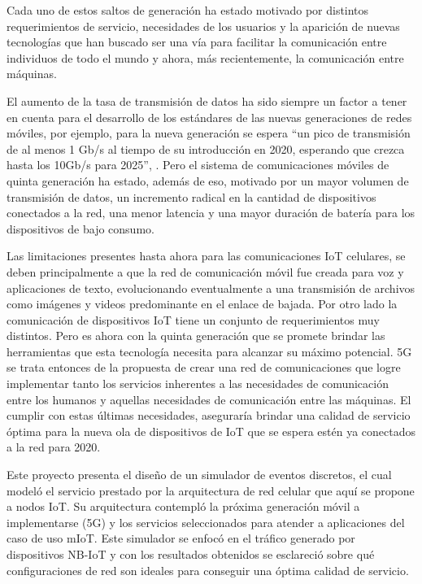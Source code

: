 Cada uno de estos saltos de generación ha estado motivado por distintos requerimientos de servicio, necesidades de los usuarios y la aparición de nuevas tecnologías que han buscado ser una vía para facilitar la comunicación entre individuos de todo el mundo y ahora, más recientemente, la comunicación entre máquinas.\newline

El aumento de la tasa de transmisión de datos ha sido siempre un factor a tener en cuenta para el desarrollo de los estándares de las nuevas generaciones de redes móviles, por ejemplo, para la nueva generación se espera “un pico de transmisión de al menos 1 Gb/s al tiempo de su introducción en 2020, esperando que crezca hasta los 10Gb/s para 2025”, \parencite{Fettweis2016}. Pero el sistema de comunicaciones móviles de quinta generación ha estado, además de eso, motivado por un mayor volumen de transmisión de datos, un incremento radical en la cantidad de dispositivos conectados a la red, una menor latencia y una mayor duración de batería para los dispositivos de bajo consumo.\newline

Las limitaciones presentes hasta ahora para las comunicaciones IoT celulares, se deben principalmente a que la red de comunicación móvil fue creada para voz y aplicaciones de texto, evolucionando eventualmente a una transmisión de archivos como imágenes y videos predominante en el enlace de bajada. Por otro lado la comunicación de dispositivos IoT tiene un conjunto de requerimientos muy distintos. Pero es ahora con la quinta generación que se promete brindar las herramientas que esta tecnología necesita para alcanzar su máximo potencial. 5G se trata entonces de la propuesta de crear una red de comunicaciones que logre implementar tanto los servicios inherentes a las necesidades de comunicación entre los humanos y aquellas necesidades de comunicación entre las máquinas. El cumplir con estas últimas necesidades, aseguraría brindar una calidad de servicio óptima para la nueva ola de dispositivos de IoT que se espera estén ya conectados a la red para 2020.\newline

Este proyecto presenta el diseño de un simulador de eventos discretos, el cual modeló el servicio prestado por la arquitectura de red celular que aquí se propone a nodos IoT. Su arquitectura contempló la próxima generación móvil a implementarse (5G) y los servicios seleccionados para atender a aplicaciones del caso de uso mIoT. Este simulador se enfocó en el tráfico generado por dispositivos NB-IoT y con los resultados obtenidos se esclareció sobre qué configuraciones de red son ideales para conseguir una óptima calidad de servicio.\newline

